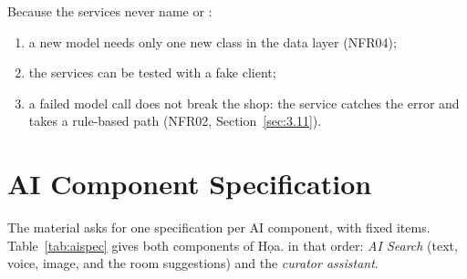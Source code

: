 Because the services never name  or :
\begin{enumerate}
\item a new model needs only one new class in the data layer (NFR04);
\item the services can be tested with a fake client;
\item a failed model call does not break the shop: the service catches the error and takes a rule-based path
      (NFR02, Section~\ref{sec:3.11}).
\end{enumerate}

\section{AI Component Specification}\label{sec:aispec}

The material asks for one specification per AI component, with fixed items. Table~\ref{tab:aispec} gives both
components of Họa. in that order: \emph{AI Search} (text, voice, image, and the room suggestions) and the
\emph{curator assistant}.

